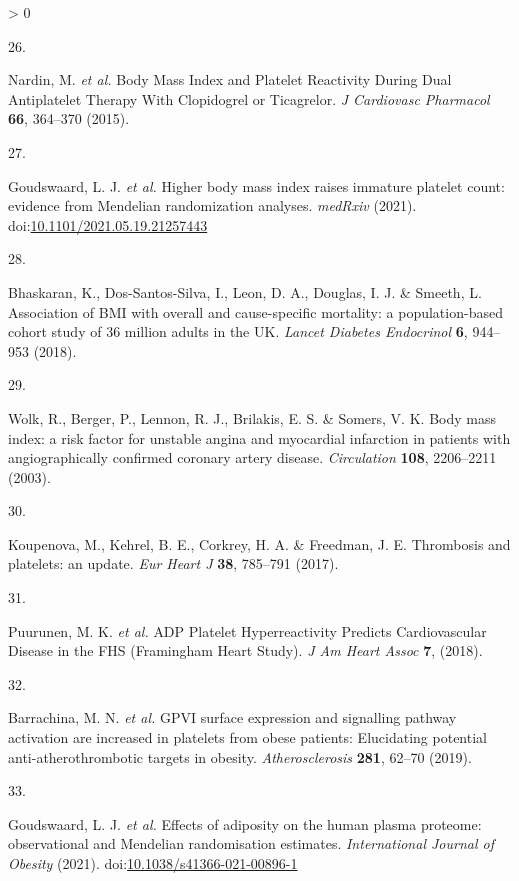 \documentclass[11pt,twoside]{bristolthesis}
\newlength{\cslhangindent}
\newlength{\csllabelwidth}
\newenvironment{CSLReferences}[2] %
 {%
  \setlength{\parindent}{0pt}
  \ifodd #1 \everypar{\setlength{\hangindent}{\cslhangindent}}\ignorespaces\fi
  \ifnum #2 > 0
  \setlength{\parskip}{#2\baselineskip}
  \fi
 }%
 {}
\newcommand{\CSLLeftMargin}[1]{\parbox[t]{\csllabelwidth}{#1}}
\newcommand{\CSLRightInline}[1]{\parbox[t]{\linewidth - \csllabelwidth}{#1}\break}
\begin{document}
\begin{CSLReferences}{0}{0}
\leavevmode\hypertarget{ref-Nardin2015}{}%
\CSLLeftMargin{26. }
\CSLRightInline{Nardin, M. \emph{et al.} {Body Mass Index and Platelet Reactivity During Dual Antiplatelet Therapy With Clopidogrel or Ticagrelor}. \emph{J Cardiovasc Pharmacol} \textbf{66}, 364--370 (2015).}

\leavevmode\hypertarget{ref-Goudswaard2021.05.19.21257443}{}%
\CSLLeftMargin{27. }
\CSLRightInline{Goudswaard, L. J. \emph{et al.} {Higher body mass index raises immature platelet count: evidence from Mendelian randomization analyses}. \emph{medRxiv} (2021). doi:\href{https://doi.org/10.1101/2021.05.19.21257443}{10.1101/2021.05.19.21257443}}

\leavevmode\hypertarget{ref-Bhaskaran2018a}{}%
\CSLLeftMargin{28. }
\CSLRightInline{Bhaskaran, K., Dos-Santos-Silva, I., Leon, D. A., Douglas, I. J. \& Smeeth, L. {Association of BMI with overall and cause-specific mortality: a population-based cohort study of 3{{}}6 million adults in the UK}. \emph{Lancet Diabetes Endocrinol} \textbf{6}, 944--953 (2018).}

\leavevmode\hypertarget{ref-Wolk2003a}{}%
\CSLLeftMargin{29. }
\CSLRightInline{Wolk, R., Berger, P., Lennon, R. J., Brilakis, E. S. \& Somers, V. K. {Body mass index: a risk factor for unstable angina and myocardial infarction in patients with angiographically confirmed coronary artery disease}. \emph{Circulation} \textbf{108}, 2206--2211 (2003).}

\leavevmode\hypertarget{ref-Koupenova2017a}{}%
\CSLLeftMargin{30. }
\CSLRightInline{Koupenova, M., Kehrel, B. E., Corkrey, H. A. \& Freedman, J. E. {Thrombosis and platelets: an update}. \emph{Eur Heart J} \textbf{38}, 785--791 (2017).}

\leavevmode\hypertarget{ref-Puurunen2018}{}%
\CSLLeftMargin{31. }
\CSLRightInline{Puurunen, M. K. \emph{et al.} {ADP Platelet Hyperreactivity Predicts Cardiovascular Disease in the FHS (Framingham Heart Study)}. \emph{J Am Heart Assoc} \textbf{7}, (2018).}

\leavevmode\hypertarget{ref-Barrachina2019}{}%
\CSLLeftMargin{32. }
\CSLRightInline{Barrachina, M. N. \emph{et al.} {GPVI surface expression and signalling pathway activation are increased in platelets from obese patients: Elucidating potential anti-atherothrombotic targets in obesity}. \emph{Atherosclerosis} \textbf{281}, 62--70 (2019).}

\leavevmode\hypertarget{ref-Goudswaard2021}{}%
\CSLLeftMargin{33. }
\CSLRightInline{Goudswaard, L. J. \emph{et al.} {Effects of adiposity on the human plasma proteome: observational and Mendelian randomisation estimates}. \emph{International Journal of Obesity} (2021). doi:\href{https://doi.org/10.1038/s41366-021-00896-1}{10.1038/s41366-021-00896-1}}


\end{CSLReferences}
\end{document}
